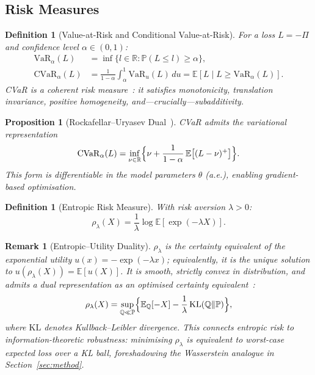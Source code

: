 \documentclass[11pt]{article}
\newtheorem{proposition}[theorem]{Proposition}
\newtheorem{definition}[theorem]{Definition}
\newtheorem{remark}[theorem]{Remark}
\newcommand{\E}{\mathbb{E}}
\newcommand{\R}{\mathbb{R}}
\newcommand{\PP}{\mathbb{P}}
\newcommand{\QQ}{\mathbb{Q}}
\newcommand{\cvar}{\mathrm{CVaR}}
\newcommand{\VaR}{\mathrm{VaR}}
\begin{document}
\subsection{Risk Measures}

\begin{definition}[Value-at-Risk and Conditional Value-at-Risk]
\label{def:cvar}
For a loss $L=-\Pi$ and confidence level $\alpha\in(0,1)$:
\begin{align}
    \VaR_\alpha(L) &= \inf\{l\in\R : \PP(L\le l)\ge\alpha\}, \label{eq:var}\\
    \cvar_\alpha(L) &= \frac{1}{1-\alpha}\int_\alpha^1 \VaR_u(L)\,du = \E[L\mid L\ge\VaR_\alpha(L)]. \label{eq:cvar}
\end{align}
CVaR is a \emph{coherent} risk measure~\citep{artzner1999coherent}: it satisfies monotonicity, translation invariance, positive homogeneity, and---crucially---subadditivity.
\end{definition}

\begin{proposition}[Rockafellar--Uryasev Dual~\citep{rockafellar2000optimization}]
\label{prop:ru}
CVaR admits the variational representation
\begin{equation}
    \cvar_\alpha(L) = \inf_{\nu\in\R}\Bigl\{\nu + \frac{1}{1-\alpha}\,\E\bigl[(L-\nu)^+\bigr]\Bigr\}.
    \label{eq:ru_dual}
\end{equation}
This form is differentiable in the model parameters $\theta$ (a.e.), enabling gradient-based optimisation.
\end{proposition}

\begin{definition}[Entropic Risk Measure]
\label{def:entropic}
With risk aversion $\lambda > 0$:
\begin{equation}
    \rho_\lambda(X) = \frac{1}{\lambda}\log\E[\exp(-\lambda X)].
    \label{eq:entropic}
\end{equation}
\end{definition}

\begin{remark}[Entropic--Utility Duality]
$\rho_\lambda$ is the certainty equivalent of the exponential utility $u(x)=-\exp(-\lambda x)$; equivalently, it is the unique solution to $u(\rho_\lambda(X))=\E[u(X)]$.  It is smooth, strictly convex in distribution, and admits a dual representation as an optimised certainty equivalent~\citep{follmer2002convex}:
\begin{equation}
    \rho_\lambda(X) = \sup_{\QQ \ll \PP}\Bigl\{\E_\QQ[-X] - \frac{1}{\lambda}\,\mathrm{KL}(\QQ\|\PP)\Bigr\},
    \label{eq:entropic_dual}
\end{equation}
where $\mathrm{KL}$ denotes Kullback--Leibler divergence.  This connects entropic risk to information-theoretic robustness: minimising $\rho_\lambda$ is equivalent to worst-case expected loss over a KL ball, foreshadowing the Wasserstein analogue in Section~\ref{sec:method}.
\end{remark}
\end{document}
